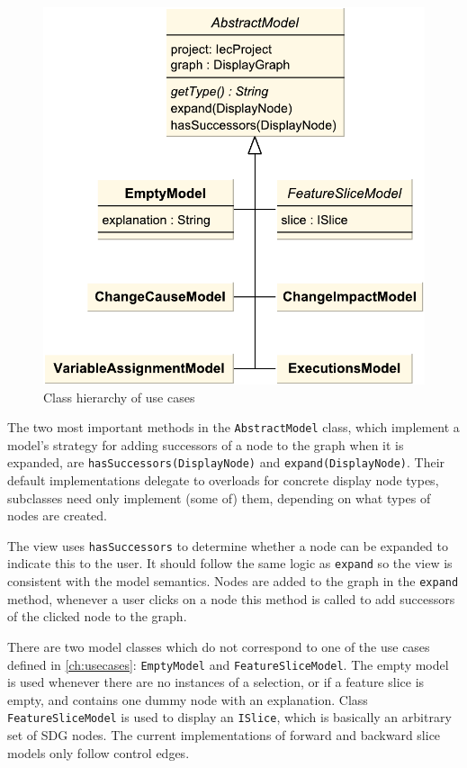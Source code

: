 \begin{figure}[htb]
  \centering
    \includegraphics[scale=0.6]{bilder/classes-usecase}
  \caption{Class hierarchy of use cases}
  \label{fig:classes-usecase}
\end{figure}

The two most important methods in the \lstinline|AbstractModel| class, which implement a model's strategy for adding 
successors of a node to the graph when it is expanded, are \lstinline|hasSuccessors(DisplayNode)| and 
\lstinline|expand(DisplayNode)|. Their default implementations delegate to overloads for concrete display node types, 
subclasses need only implement (some of) them, depending on what types of nodes are created.

The view uses \lstinline|hasSuccessors| to determine whether a node can be expanded to indicate this to the user. It 
should follow the same logic as \lstinline|expand| so the view is consistent with the model semantics. Nodes are added 
to the graph in the \lstinline|expand| method, whenever a user clicks on a node this method is called to add successors 
of the clicked node to the graph.

There are two model classes which do not correspond to one of the use cases defined in \autoref{ch:usecases}: 
\lstinline|EmptyModel| and \lstinline|FeatureSliceModel|. The empty model is used whenever there are no instances of a 
selection, or if a feature slice is empty, and contains one dummy node with an explanation. Class 
\lstinline|FeatureSliceModel| is used to display an \lstinline|ISlice|, which is basically an arbitrary set of SDG 
nodes. The current implementations of forward and backward slice models only follow control edges.

